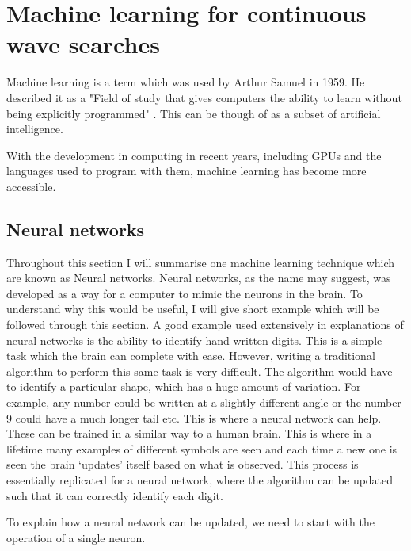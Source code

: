 \chapter{\label{cnn} Machine learning for continuous wave searches}


Machine learning is a term which was used by Arthur Samuel in 1959. 
He described it as a "Field of study that gives computers the ability to learn without being explicitly programmed" \cite{}.
This can be though of as a subset of artificial intelligence. 

With the development in computing in recent years, including GPUs and the languages used to program with them, machine learning has become more accessible. 

\section{\label{machine:nn}Neural networks}


Throughout this section I will summarise one machine learning technique which are known as Neural networks. 
Neural networks, as the name may suggest, was developed as a way for a computer to mimic the neurons in the brain.
To understand why this would be useful, I will give short example which will be followed through this section.
A good example used extensively in explanations of neural networks is the ability to identify hand written digits.
This is a simple task which the brain can complete with ease. 
However, writing a traditional algorithm to perform this same task is very difficult. 
The algorithm would have to identify a particular shape, which has a huge amount of variation.
For example, any number could be written at a slightly different angle or the number 9 could have a much longer tail etc.
This is where a neural network can help. 
These can be trained in a similar way to a human brain. 
This is where in a lifetime many examples of different symbols are seen and each time a new one is seen the brain `updates' itself based on what is observed. 
This process is essentially replicated for a neural network, where the algorithm can be updated such that it can correctly identify each digit.

To explain how a neural network can be updated, we need to start with the operation of a single neuron.


